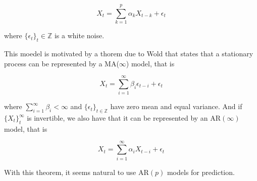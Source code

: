 \documentclass{article}
\begin{document}
$$X_t = \sum_{k=1}^p \alpha_k X_{t-k} + \epsilon_t$$

where $\{ \epsilon_t \}_t \in \mathbb{Z}$ is a white noise.

This moedel is motivated by a thorem due to Wold that states that a stationary process can be represented by a MA($\infty$) model, that is

$$X_t = \sum_{i=1}^{\infty} \beta_i \epsilon_{t-i} + \epsilon_t$$

where $\sum_{i=1}^\infty \beta_i < \infty$ and $\{\epsilon_t\}_{t \in \mathbb{Z}}$ have zero mean and equal variance. And if $\{ X_t \}_t^\infty$ is invertible, we also have that it can be represented by an AR$(\infty)$ model, that is

$$X_t = \sum_{i=1}^{\infty} \alpha_i X_{t-i} + \epsilon_t$$

With this theorem, it seems natural to use AR$(p)$ models for prediction.
\end{document}
